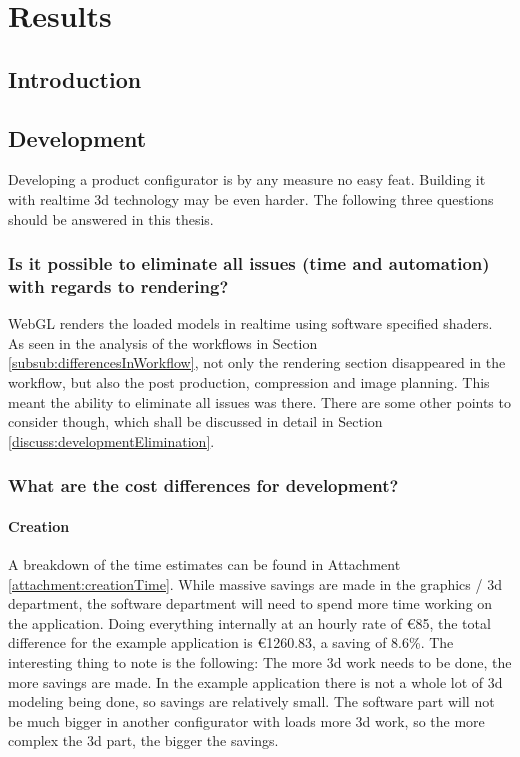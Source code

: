     
    
\chapter{Results}

\section{Introduction}


\section{Development}
Developing a product configurator is by any measure no easy feat. Building it with realtime 3d technology may be even harder. The following three questions should be answered in this thesis.

\subsection {Is it possible to eliminate all issues (time and automation) with regards to rendering?}
WebGL renders the loaded models in realtime using software specified shaders. As seen in the analysis of the workflows in Section \ref{subsub:differencesInWorkflow}, not only the rendering section disappeared in the workflow, but also the post production, compression and image planning. This meant the ability to eliminate all issues was there. There are some other points to consider though, which shall be discussed in detail in Section \ref{discuss:developmentElimination}.

\subsection{What are the cost differences for development?}
\subsubsection{Creation}
A breakdown of the time estimates can be found in Attachment \ref{attachment:creationTime}. While massive savings are made in the graphics / 3d department, the software department will need to spend more time working on the application. Doing everything internally at an hourly rate of €85, the total difference for the example application is €1260.83, a saving of 8.6\%. The interesting thing to note is the following: The more 3d work needs to be done, the more savings are made. In the example application there is not a whole lot of 3d modeling being done, so savings are relatively small. The software part will not be much bigger in another configurator with loads more 3d work, so the more complex the 3d part, the bigger the savings.

